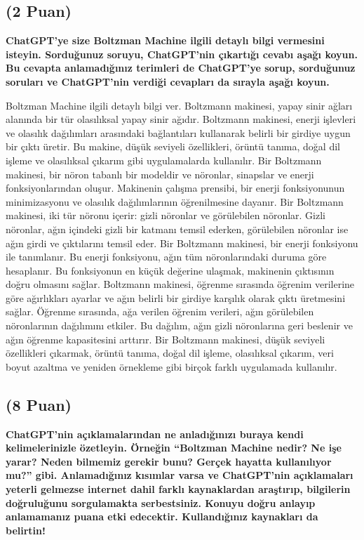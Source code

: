 \documentclass[11pt]{article}
\begin{document}
\subsection{(2 Puan)} \textbf{ChatGPT’ye size Boltzman Machine ilgili detaylı bilgi vermesini isteyin. Sorduğunuz soruyu, ChatGPT'nin çıkartığı cevabı aşağı koyun. Bu cevapta anlamadığınız terimleri de ChatGPT’ye sorup, sorduğunuz soruları ve ChatGPT’nin verdiği cevapları da sırayla aşağı koyun.}

Boltzman Machine ilgili detaylı bilgi ver.
Boltzmann makinesi, yapay sinir ağları alanında bir tür olasılıksal yapay sinir ağıdır. Boltzmann makinesi, enerji işlevleri ve olasılık dağılımları arasındaki bağlantıları kullanarak belirli bir girdiye uygun bir çıktı üretir. Bu makine, düşük seviyeli özellikleri, örüntü tanıma, doğal dil işleme ve olasılıksal çıkarım gibi uygulamalarda kullanılır.
Bir Boltzmann makinesi, bir nöron tabanlı bir modeldir ve nöronlar, sinapslar ve enerji fonksiyonlarından oluşur. Makinenin çalışma prensibi, bir enerji fonksiyonunun minimizasyonu ve olasılık dağılımlarının öğrenilmesine dayanır.
Bir Boltzmann makinesi, iki tür nöronu içerir: gizli nöronlar ve görülebilen nöronlar. Gizli nöronlar, ağın içindeki gizli bir katmanı temsil ederken, görülebilen nöronlar ise ağın girdi ve çıktılarını temsil eder.
Bir Boltzmann makinesi, bir enerji fonksiyonu ile tanımlanır. Bu enerji fonksiyonu, ağın tüm nöronlarındaki duruma göre hesaplanır. Bu fonksiyonun en küçük değerine ulaşmak, makinenin çıktısının doğru olmasını sağlar.
Boltzmann makinesi, öğrenme sırasında öğrenim verilerine göre ağırlıkları ayarlar ve ağın belirli bir girdiye karşılık olarak çıktı üretmesini sağlar. Öğrenme sırasında, ağa verilen öğrenim verileri, ağın görülebilen nöronlarının dağılımını etkiler. Bu dağılım, ağın gizli nöronlarına geri beslenir ve ağın öğrenme kapasitesini arttırır.
Bir Boltzmann makinesi, düşük seviyeli özellikleri çıkarmak, örüntü tanıma, doğal dil işleme, olasılıksal çıkarım, veri boyut azaltma ve yeniden örnekleme gibi birçok farklı uygulamada kullanılır.


\subsection{(8 Puan)} \textbf{ChatGPT’nin açıklamalarından ne anladığınızı buraya kendi kelimelerinizle özetleyin. Örneğin ``Boltzman Machine nedir? Ne işe yarar? Neden bilmemiz gerekir bunu? Gerçek hayatta kullanılıyor mu?'' gibi. Anlamadığınız kısımlar varsa ve ChatGPT’nin açıklamaları yeterli gelmezse internet dahil farklı kaynaklardan araştırıp, bilgilerin doğruluğunu sorgulamakta serbestsiniz. Konuyu doğru anlayıp anlamamanız puana etki edecektir. Kullandığınız kaynakları da belirtin!}
\end{document}
